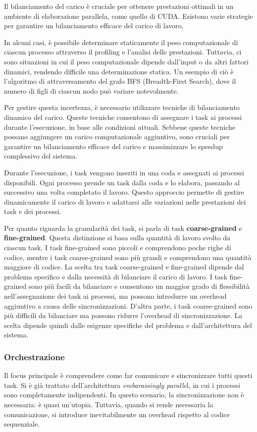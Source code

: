 Il bilanciamento del carico è cruciale per ottenere prestazioni ottimali in un ambiente di elaborazione parallela, come quello di CUDA. Esistono varie strategie per garantire un bilanciamento efficace del carico di lavoro.

In alcuni casi, è possibile determinare staticamente il peso computazionale di ciascun processo attraverso il profiling e l'analisi delle prestazioni. Tuttavia, ci sono situazioni in cui il peso computazionale dipende dall'input o da altri fattori dinamici, rendendo difficile una determinazione statica. Un esempio di ciò è l'algoritmo di attraversamento del grafo BFS (Breadth-First Search), dove il numero di figli di ciascun nodo può variare notevolmente.

Per gestire questa incertezza, è necessario utilizzare tecniche di bilanciamento dinamico del carico. Queste tecniche consentono di assegnare i task ai processi durante l'esecuzione, in base alle condizioni attuali. Sebbene queste tecniche possano aggiungere un carico computazionale aggiuntivo, sono cruciali per garantire un bilanciamento efficace del carico e massimizzare lo speedup complessivo del sistema.

Durante l'esecuzione, i task vengono inseriti in una coda e assegnati ai processi disponibili. Ogni processo prende un task dalla coda e lo elabora, passando al successivo una volta completato il lavoro. Questo approccio permette di gestire dinamicamente il carico di lavoro e adattarsi alle variazioni nelle prestazioni dei task e dei processi.

Per quanto riguarda la granularità dei task, si parla di task \textbf{coarse-grained} e \textbf{fine-grained}. Questa distinzione si basa sulla quantità di lavoro svolto da ciascun task. I task fine-grained sono piccoli e comprendono poche righe di codice, mentre i task coarse-grained sono più grandi e comprendono una quantità maggiore di codice. La scelta tra task coarse-grained e fine-grained dipende dal problema specifico e dalla necessità di bilanciare il carico di lavoro. I task fine-grained sono più facili da bilanciare e consentono un maggior grado di flessibilità nell'assegnazione dei task ai processi, ma possono introdurre un overhead aggiuntivo a causa delle sincronizzazioni. D'altra parte, i task coarse-grained sono più difficili da bilanciare ma possono ridurre l'overhead di sincronizzazione. La scelta dipende quindi dalle esigenze specifiche del problema e dall'architettura del sistema.
\subsubsection{Orchestrazione}
Il focus principale è comprendere come far comunicare e sincronizzare tutti questi task. Si è già trattato dell'architettura \textit{embarassingly paralle}l, in cui i processi sono completamente indipendenti. In questo scenario, la sincronizzazione non è necessaria: è quasi un'utopia. Tuttavia, quando si rende necessaria la comunicazione, si introduce inevitabilmente un overhead rispetto al codice sequenziale.

